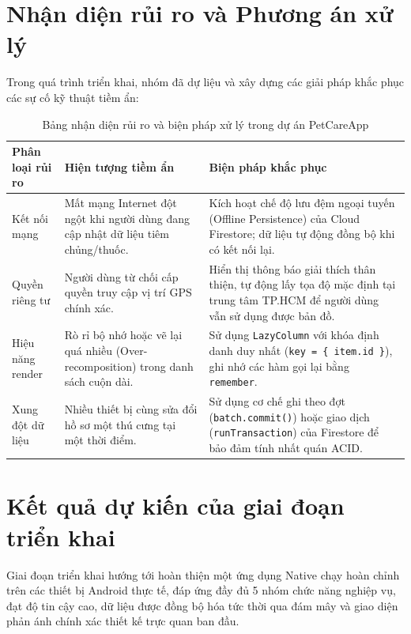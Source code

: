 \section{Nhận diện rủi ro và Phương án xử lý}
\label{sec:quan_ly_rui_ro}

Trong quá trình triển khai, nhóm đã dự liệu và xây dựng các giải pháp khắc phục các sự cố kỹ thuật tiềm ẩn:

\begin{table}[H]
    \caption{Bảng nhận diện rủi ro và biện pháp xử lý trong dự án PetCareApp}
    \label{tab:bang_rui_ro}
    \centering
    \renewcommand{\arraystretch}{1.2}
    \begin{tabularx}{\textwidth}{|l|X|X|}
        \hline
        \textbf{Phân loại rủi ro} & \textbf{Hiện tượng tiềm ẩn} & \textbf{Biện pháp khắc phục} \\ \hline
        Kết nối mạng & Mất mạng Internet đột ngột khi người dùng đang cập nhật dữ liệu tiêm chủng/thuốc. & Kích hoạt chế độ lưu đệm ngoại tuyến (Offline Persistence) của Cloud Firestore; dữ liệu tự động đồng bộ khi có kết nối lại. \\ \hline
        Quyền riêng tư & Người dùng từ chối cấp quyền truy cập vị trí GPS chính xác. & Hiển thị thông báo giải thích thân thiện, tự động lấy tọa độ mặc định tại trung tâm TP.HCM để người dùng vẫn sử dụng được bản đồ. \\ \hline
        Hiệu năng render & Rò rỉ bộ nhớ hoặc vẽ lại quá nhiều (Over-recomposition) trong danh sách cuộn dài. & Sử dụng \texttt{LazyColumn} với khóa định danh duy nhất (\texttt{key = \{ item.id \}}), ghi nhớ các hàm gọi lại bằng \texttt{remember}. \\ \hline
        Xung đột dữ liệu & Nhiều thiết bị cùng sửa đổi hồ sơ một thú cưng tại một thời điểm. & Sử dụng cơ chế ghi theo đợt (\texttt{batch.commit()}) hoặc giao dịch (\texttt{runTransaction}) của Firestore để bảo đảm tính nhất quán ACID. \\ \hline
    \end{tabularx}
\end{table}

\section{Kết quả dự kiến của giai đoạn triển khai}
\label{sec:ket_qua_du_kien}

Giai đoạn triển khai hướng tới hoàn thiện một ứng dụng Native chạy hoàn chỉnh trên các thiết bị Android thực tế, đáp ứng đầy đủ 5 nhóm chức năng nghiệp vụ, đạt độ tin cậy cao, dữ liệu được đồng bộ hóa tức thời qua đám mây và giao diện phản ánh chính xác thiết kế trực quan ban đầu.

